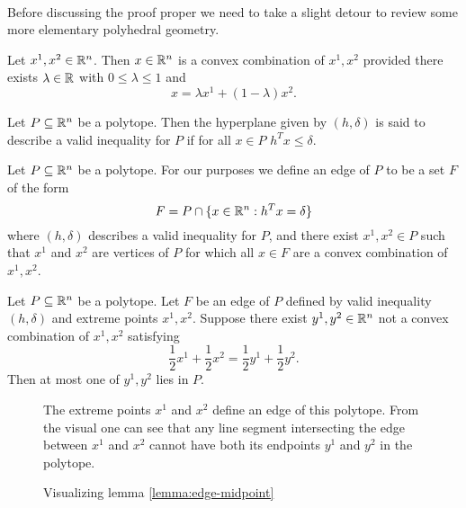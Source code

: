 \paragraph{}
Before discussing the proof proper we need to take a slight detour to review some more elementary polyhedral geometry.
\begin{definition}
Let $x^1, x^2 \in \mathbb{R}^n$. Then $x \in \mathbb{R}^n$ is a convex combination of $x^1, x^2$ provided there exists $\lambda \in \mathbb{R}$ with $0 \leq \lambda \leq 1$ and $$x = \lambda x^1 + (1-\lambda)x^2.$$
\end{definition}
\begin{definition}
Let $P\subseteq \mathbb{R}^n$ be a polytope. Then the hyperplane given by $(h,\delta)$ is said to describe a valid inequality for $P$ if for all $x \in P$ $h^Tx \leq \delta$.
\end{definition}
\begin{definition}
Let $P \subseteq \mathbb{R}^n$ be a polytope. For our purposes we define an edge of $P$ to be a set $F$ of the form $$F = P \cap \{x \in \mathbb{R}^n: h^Tx = \delta \}$$ where $(h,\delta)$ describes a valid inequality for $P$, and there exist $x^1, x^2 \in P$ such that $x^1$ and $x^2$ are vertices of $P$ for which all $x \in F$ are a convex combination of $x^1, x^2$.
\end{definition}
\begin{lemma}\label{lemma:edge-midpoint}
Let $P \subseteq \mathbb{R}^n$ be a polytope. Let $F$ be an edge of $P$ defined by valid inequality $(h,\delta)$ and extreme points $x^1, x^2$. Suppose there exist $y^1, y^2 \in \mathbb{R}^n$ not a convex combination of $x^1, x^2$ satisfying
$$\frac{1}{2}x^1 + \frac{1}{2} x^2 = \frac{1}{2} y^1 + \frac{1}{2}y^2.$$
Then at most one of $y^1, y^2$ lies in $P$.
\end{lemma}
\begin{figure}
\centering
{}
\caption{Visualizing lemma \ref{lemma:edge-midpoint}}
\small
\begin{flushleft}
The extreme points $x^1$ and $x^2$ define an edge of this polytope. From the visual one can see that any line segment intersecting the edge between $x^1$ and $x^2$ cannot have both its endpoints $y^1$ and $y^2$ in the polytope.
\end{flushleft}
\end{figure}
